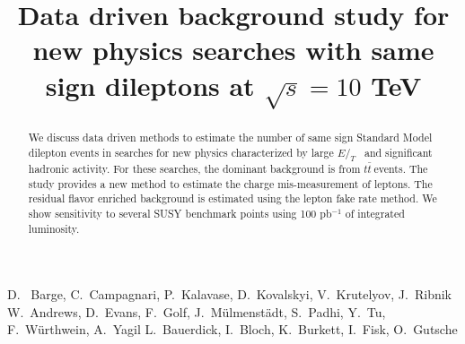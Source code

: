 \documentclass{cmspaper}
\newcommand{\met} {\ensuremath{E\!\!\!\!/_T}}
\newcommand{\ttbar} {\ensuremath{t\bar{t}~}}
\begin{document}
%
\begin{titlepage}
\title{Data driven background study for new physics searches with same sign dileptons at $\sqrt{s} = 10 $ TeV}

  \begin{Authlist}
    D.~ Barge, C.~Campagnari, P.~Kalavase, D.~Kovalskyi, V.~Krutelyov, J.~Ribnik
    W.~Andrews, D.~Evans, F.~Golf, J.~M\"ulmenst\"adt, S.~Padhi, Y.~Tu, F.~W\"urthwein, A.~Yagil
    L.~Bauerdick, I.~Bloch, K.~Burkett, I.~Fisk, O.~Gutsche
  \end{Authlist}

\begin{abstract}
We discuss data driven methods to estimate the number of same sign Standard Model dilepton
events in searches for new physics characterized by large \met~ and significant hadronic
activity.  For these searches, the dominant background is from \ttbar events. The study 
provides a new method to estimate the charge mis-measurement of leptons. The residual
flavor enriched background is estimated using the lepton fake rate method. We show sensitivity to  
several SUSY benchmark points using 100 pb$^{-1}$ of integrated luminosity.
\end{abstract}
\end{titlepage}











\clearpage

\end{document}
